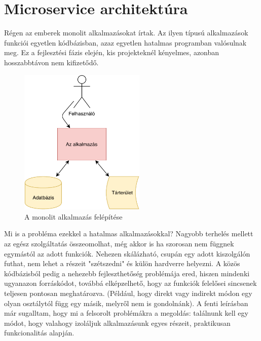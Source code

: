 \section{Microservice architektúra}
Régen az emberek monolit alkalmazásokat írtak. Az ilyen típusú alkalmazások funkciói egyetlen kódbázisban, azaz egyetlen hatalmas programban valósulnak meg. Ez a fejlesztési fázis elején, kis projekteknél kényelmes, azonban hosszabbtávon nem kifizetődő.
\begin{figure}[!ht]
\centering
\includegraphics[width=60mm, keepaspectratio]{img/app_monolit.pdf}
\caption{A monolit alkalmazás felépítése}
\end{figure}
\vskip 0.1in
Mi is a probléma ezekkel a hatalmas alkalmazásokkal? Nagyobb terhelés mellett az egész szolgáltatás összeomolhat, még akkor is ha szorosan nem függnek egymástól az adott funkciók. Nehezen skálázható, csupán egy adott kiszolgálón futhat, nem lehet a részeit "szétszedni" és külön hardverre helyezni. A közös kódbázisból pedig a nehezebb fejleszthetőség problémája ered, hiszen mindenki ugyanazon forráskódot, továbbá elképzelhető, hogy az funkciók felelősei sincsenek teljesen pontosan meghatározva. (Például, hogy direkt vagy indirekt módon egy olyan osztálytól függ egy másik, melyről nem is gondolnánk).
\vskip 0.1in
A fenti leírásban már sugalltam, hogy mi a felsorolt problémákra a megoldás: találnunk kell egy módot, hogy valahogy izoláljuk alkalmazásunk egyes részeit, praktikusan funkcionalitás alapján.
